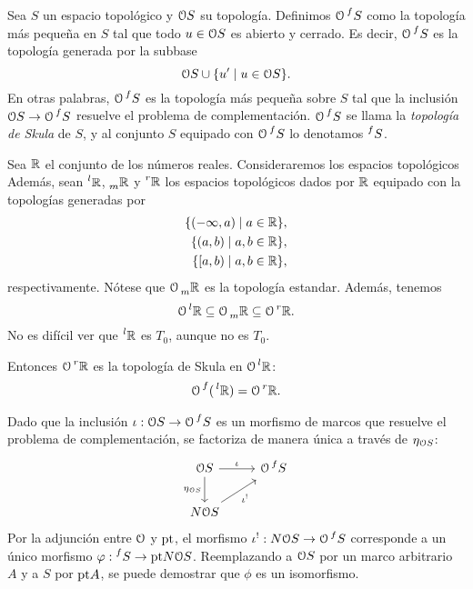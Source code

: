 \begin{definition}
    Sea $S$ un espacio topológico y $\cal OS$ su topología.
    Definimos $\cal O\prs f{}S$ como la topología más pequeña
    en $S$ tal que todo $u\in\cal OS$ es abierto y cerrado.
    Es decir, $\cal O\prs f{}S$ es la topología generada por la subbase
    \[
        \cal OS\cup\{u'\mid u\in\cal OS\}
    .\]
    En otras palabras, $\cal O\prs f{}S$
    es la topología más pequeña sobre $S$
    tal que la inclusión $\cal OS\to\cal O\prs f{}S$ resuelve
    el problema de complementación.
    $\cal O\prs f{}S$ se llama la \emph{topología de Skula}
    de $S$, y al conjunto $S$ equipado con $\cal O\prs f{}S$
    lo denotamos $\prs f{}S$.
\end{definition}

\begin{example}
    Sea $\R$ el conjunto de los números reales.
    Consideraremos los espacios topológicos
    Además, sean $\prs l{}\R$, $\prs{}m\R$
    y $\prs r{}\R$ los espacios topológicos dados por $\R$
    equipado con la topologías generadas por
    \begin{align*}
        \{(-\infty,a)\mid a\in\R\}, \\
        \{(a,b)\mid a,b\in\R\}, \\
        \{[a,b)\mid a,b\in\R\},
    \end{align*}
    respectivamente.
    Nótese que $\cal O\prs{}m\R$ es la topología estandar.
    Además, tenemos
    \[
        \cal O\prs l{}\R
        \subseteq
        \cal O\prs{}m\R
        \subseteq
        \cal O\prs r{}\R.
    \]
    No es difícil ver que $\prs l{}\R$ es $T_0$,
    aunque no es $T_0$.
    
    Entonces $\cal O\prs r{}\R$ es la topología de Skula
    en $\cal O\prs l{}\R$:
    \[
        \cal O\prs f{}(\prs l{}\R)
        = \cal O\prs r{}\R
    .\]
\end{example}

Dado que la inclusión $\iota:\cal OS\to\cal O\prs f{}S$
es un morfismo de marcos que resuelve el problema de complementación,
se factoriza de manera única a través de $\eta_{\cal OS}$:
\[
    \begin{tikzcd}
        \cal OS \ar[d,"\eta_{\cal OS}"'] \ar[r,"\iota"]
        & \cal O\prs f{}S \\
        N\cal OS \ar[ur,"\iota^!"']
    \end{tikzcd}
\]
Por la adjunción entre $\cal O$ y $\pt$,
el morfismo $\iota^!:N\cal OS\to\cal O\prs f{}S$ corresponde
a un único morfismo $\phi:\prs f{}S\to\pt N\cal OS$.
Reemplazando a $\cal OS$ por un marco arbitrario $A$
y a $S$ por $\pt A$,
se puede demostrar que $\phi$ es un isomorfismo.

